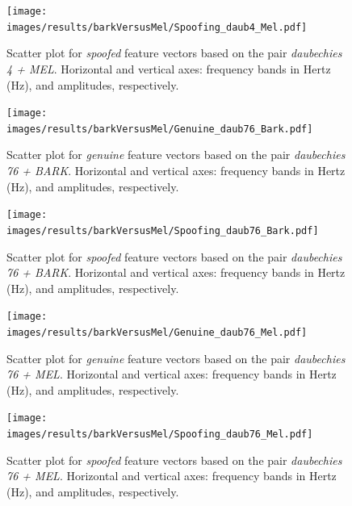 		\begin{figure}[H]
			\centering
			\texttt{[image: images/results/barkVersusMel/Spoofing\_daub4\_Mel.pdf]}
			\caption{Scatter plot for \textit{spoofed} feature vectors  based on the pair \textit{daubechies 4 + MEL}. Horizontal and vertical axes: frequency bands in Hertz (Hz), and amplitudes, respectively.}
			\label{fig:spoofingdaub4mel}
		\end{figure}
		\begin{figure}[H]
			\centering
			\texttt{[image: images/results/barkVersusMel/Genuine\_daub76\_Bark.pdf]}
			\caption{Scatter plot for \textit{genuine} feature vectors based on the pair \textit{daubechies 76 + BARK}. Horizontal and vertical axes: frequency bands in Hertz (Hz), and amplitudes, respectively.}
			\label{fig:livedaub76bark}
		\end{figure}
		\begin{figure}[H]
			\centering
			\texttt{[image: images/results/barkVersusMel/Spoofing\_daub76\_Bark.pdf]}
			\caption{Scatter plot for \textit{spoofed} feature vectors based on the pair \textit{daubechies 76 + BARK}. Horizontal and vertical axes: frequency bands in Hertz (Hz), and amplitudes, respectively.}
			\label{fig:spoofingdaub76bark}
		\end{figure}
		\begin{figure}[H]
			\centering
			\texttt{[image: images/results/barkVersusMel/Genuine\_daub76\_Mel.pdf]}
			\caption{Scatter plot for \textit{genuine} feature vectors  based on the pair \textit{daubechies 76 + MEL}. Horizontal and vertical axes: frequency bands in Hertz (Hz), and amplitudes, respectively.}
			\label{fig:livedaub76mel}
		\end{figure}
		\begin{figure}[H]
			\centering
			\texttt{[image: images/results/barkVersusMel/Spoofing\_daub76\_Mel.pdf]}
			\caption{Scatter plot for \textit{spoofed} feature vectors  based on the pair \textit{daubechies 76 + MEL}. Horizontal and vertical axes: frequency bands in Hertz (Hz), and amplitudes, respectively.}
			\label{fig:spoofingdaub76mel}
		\end{figure}